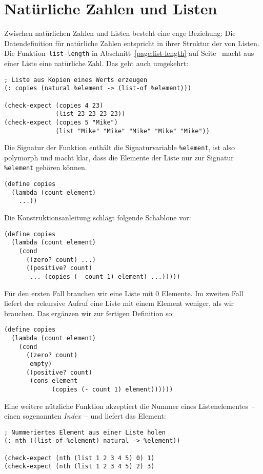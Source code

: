 \section{Natürliche Zahlen und Listen}
\label{func:copies}
Zwischen natürlichen Zahlen und Listen besteht eine enge Beziehung:
Die Datendefinition für natürliche Zahlen entspricht in ihrer Struktur
der von Listen.  Die Funktion~\lstinline{list-length} in
Abschnitt~\ref{page:list-length} auf Seite~\pageref{page:list-length}
macht aus einer Liste eine natürliche Zahl.  Das geht auch umgekehrt:
%
\begin{lstlisting}
; Liste aus Kopien eines Werts erzeugen
(: copies (natural %element -> (list-of %element)))

(check-expect (copies 4 23)
              (list 23 23 23 23))
(check-expect (copies 5 "Mike")
              (list "Mike" "Mike" "Mike" "Mike" "Mike"))
\end{lstlisting}
%
Die Signatur der Funktion enthält die Signaturvariable \lstinline{%element}, ist also
polymorph und macht klar, dass die Elemente der Liste nur zur Signatur
\lstinline{%element} gehören können.
%
\begin{lstlisting}
(define copies
  (lambda (count element)
    ...))
\end{lstlisting}
%
Die Konstruktionsanleitung schlägt folgende Schablone vor:
%
\begin{lstlisting}
(define copies
  (lambda (count element)
    (cond
      ((zero? count) ...)
      ((positive? count)
       ... (copies (- count 1) element) ...)))))
\end{lstlisting}
%
Für den ersten Fall brauchen wir eine Liste mit 0 Elemente.  Im
zweiten Fall liefert der rekursive Aufruf eine Liste mit einem Element
weniger, als wir brauchen. Das ergänzen wir zur fertigen Definition
so:
%
\begin{lstlisting}
(define copies
  (lambda (count element)
    (cond
      ((zero? count)
       empty)
      ((positive? count)
       (cons element
             (copies (- count 1) element))))))
\end{lstlisting}
%
Eine weitere nützliche Funktion akzeptiert die Nummer eines
Listenelementes~-- einen sogenannten \textit{Index}~--
und liefert das Element:
%
\begin{lstlisting}
; Nummeriertes Element aus einer Liste holen
(: nth ((list-of %element) natural -> %element))

(check-expect (nth (list 1 2 3 4 5) 0) 1)
(check-expect (nth (list 1 2 3 4 5) 2) 3)
\end{lstlisting}
